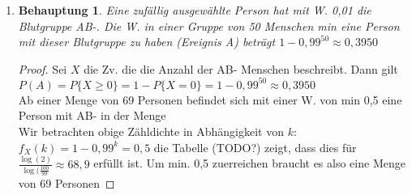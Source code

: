 \documentclass[a4paper]{scrartcl}
\newtheorem*{behaupt}{Behauptung}
\begin{document}
\begin{enumerate}[label=\bfseries\arabic*.]
    \item
    	\begin{behaupt}
    		Eine zufällig ausgewählte Person hat mit W. 0,01 die Blutgruppe AB-.
    		Die W. in einer Gruppe von 50 Menschen min eine Person mit dieser
    		Blutgruppe zu haben (Ereignis A) beträgt $1-0,99^{50}\approx 0,3950$
    	\end{behaupt}
    	\begin{proof}
    		Sei $X$ die Zv. die die Anzahl der AB- Menschen beschreibt. Dann
    		gilt $P(A)=P\{X\ge 0\}=1-P\{X=0\}=1-0,99^{50}\approx 0,3950$\\
    		Ab einer Menge von 69 Personen befindet sich mit einer W. von min
    		0,5 eine Person mit AB- in der Menge\\
    		Wir betrachten obige Zähldichte in Abhängigkeit von $k$:
    		$f_X(k)=1-0,99^k=0,5$ die Tabelle (TODO?) zeigt, dass dies für
    		$\frac{\log(2)}{\log(\frac{100}{99}}\approx 68,9$ erfüllt ist.
    		Um min. 0,5 zuerreichen braucht es also eine Menge von 69 Personen
    	\end{proof}
        
\end{enumerate}
\end{document}
